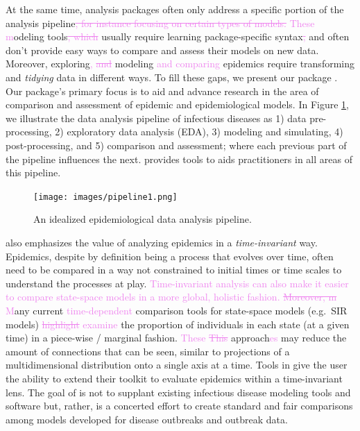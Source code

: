 \documentclass[
  shortnames]{jss}
\begin{document}
At the same time, analysis packages often only address a specific
portion of the analysis
pipeline\textcolor{violet}{\sout{, for instance focusing on certain types of models.}}
\textcolor{violet}{These m}odeling
tools\textcolor{violet}{\sout{, which}} usually require learning
package-specific syntax\textcolor{violet}{\sout{,}} and often don't
provide easy ways to compare and assess their models on new data.
Moreover, exploring\textcolor{violet}{, \sout{and}} modeling
\textcolor{violet}{and comparing} epidemics require transforming and
\textit{tidying} data in different ways. To fill these gaps, we present
our  package . Our package's primary focus
is to aid and advance research in the area of comparison and assessment
of epidemic and epidemiological models. In Figure \ref{fig:pipeline}, we
illustrate the data analysis pipeline of infectious diseases as 1) data
pre-processing, 2) exploratory data analysis (EDA), 3) modeling and
simulating, 4) post-processing, and 5) comparison and assessment; where
each previous part of the pipeline influences the next. 
provides tools to aids practitioners in all areas of this pipeline.

\begin{figure}[!ht]
    \centering
    \texttt{[image: images/pipeline1.png]}
    \caption{An idealized epidemiological data analysis pipeline.}
    \label{fig:pipeline}
\end{figure}

 also emphasizes the value of analyzing epidemics in a
\textit{time-invariant} way. Epidemics, despite by definition being a
process that evolves over time, often need to be compared in a way not
constrained to initial times or time scales to understand the processes
at play.
\textcolor{violet}{Time-invariant analysis can also make it easier to compare state-space models in a more global, holistic fashion. \sout{Moreover, m} M}any
current \textcolor{violet}{time-dependent} comparison tools for
state-space models (e.g.~SIR models)
\textcolor{violet}{\sout{highlight} examine} the proportion of
individuals in each state (at a given time) in a piece-wise / marginal
fashion. \textcolor{violet}{These \sout{This}}
approach\textcolor{violet}{es} may reduce the amount of connections that
can be seen, similar to projections of a multidimensional distribution
onto a single axis at a time. Tools in  give the user
the ability to extend their toolkit to evaluate epidemics within a
time-invariant lens. The goal of  is not to supplant
existing infectious disease modeling tools and software but, rather, is
a concerted effort to create standard and fair comparisons among models
developed for disease outbreaks and outbreak data.
\end{document}
